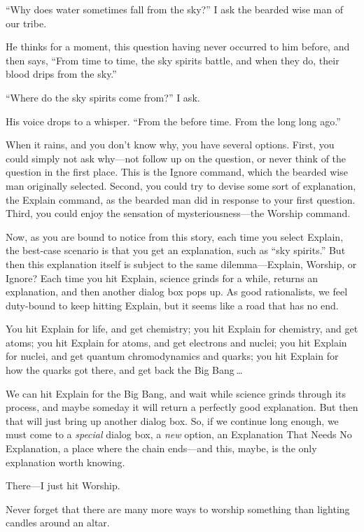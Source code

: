 {
 ``Why does water sometimes fall from the
sky?'' I ask the bearded wise man of our tribe.}

{
 He thinks for a moment, this question having never occurred to him
before, and then says, ``From time to time, the sky
spirits battle, and when they do, their blood drips from the
sky.''}

{
 ``Where do the sky spirits come
from?'' I ask.}

{
 His voice drops to a whisper. ``From the before
time. From the long long ago.''}

{
 When it rains, and you don't know why, you have
several options. First, you could simply not ask why---not follow up on
the question, or never think of the question in the first place. This
is the Ignore command, which the bearded wise man originally selected.
Second, you could try to devise some sort of explanation, the Explain
command, as the bearded man did in response to your first question.
Third, you could enjoy the sensation of mysteriousness---the Worship
command.}

{
 Now, as you are bound to notice from this story, each time you
select Explain, the best-case scenario is that you get an explanation,
such as ``sky spirits.'' But then
this explanation itself is subject to the same dilemma---Explain,
Worship, or Ignore? Each time you hit Explain, science grinds for a
while, returns an explanation, and then another dialog box pops up. As
good rationalists, we feel duty-bound to keep hitting Explain, but it
seems like a road that has no end.}

{
 You hit Explain for life, and get chemistry; you hit Explain for
chemistry, and get atoms; you hit Explain for atoms, and get electrons
and nuclei; you hit Explain for nuclei, and get quantum chromodynamics
and quarks; you hit Explain for how the quarks got there, and get back
the Big Bang\,\ldots}

{
 We can hit Explain for the Big Bang, and wait while science grinds
through its process, and maybe someday it will return a perfectly good
explanation. But then that will just bring up another dialog box. So,
if we continue long enough, we must come to a \textit{special} dialog
box, a \textit{new} option, an Explanation That Needs No Explanation, a
place where the chain ends---and this, maybe, is the only explanation
worth knowing.}

{
 There---I just hit Worship.}

{
 Never forget that there are many more ways to worship something
than lighting candles around an altar.}

